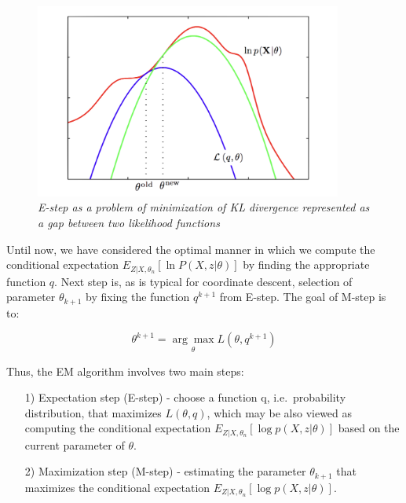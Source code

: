\begin{figure}[ht]

\begin{center}
	\includegraphics[width=0.9\textwidth]{Figs/Loglike.png}
\end{center}

\caption{\textit{E-step as a problem of minimization of KL divergence represented as a gap between two likelihood functions}}

\end{figure}

Until now, we have considered the optimal manner in which we compute the conditional expectation $E_{Z|X,\theta_n} [\ln P(X,z|\theta)]$ by finding the appropriate function $q$. Next step is, as is typical for coordinate descent, selection of parameter $\theta_{k+1}$ by fixing the function $q^{k+1}$ from E-step. The goal of M-step is to:

\begin{equation}
\theta^{k+1} = \underset{\theta}{\arg\max} L(\theta, q^{k+1})
\end{equation}

Thus, the EM algorithm involves two main steps:

\begin{itemize}
\item[1)] Expectation step (E-step) - choose a function q, i.e.\ probability distribution, that maximizes $L(\theta, q)$, which may be also viewed as computing the conditional expectation $E_{Z|X,\theta_n} [\log p(X,z|\theta)]$ based on the current parameter of $\theta$.
\item[2)] Maximization step (M-step) - estimating the parameter $\theta_{k+1}$ that maximizes the conditional expectation $E_{Z|X,\theta_n} [\log p(X,z|\theta)]$.
\end{itemize}

